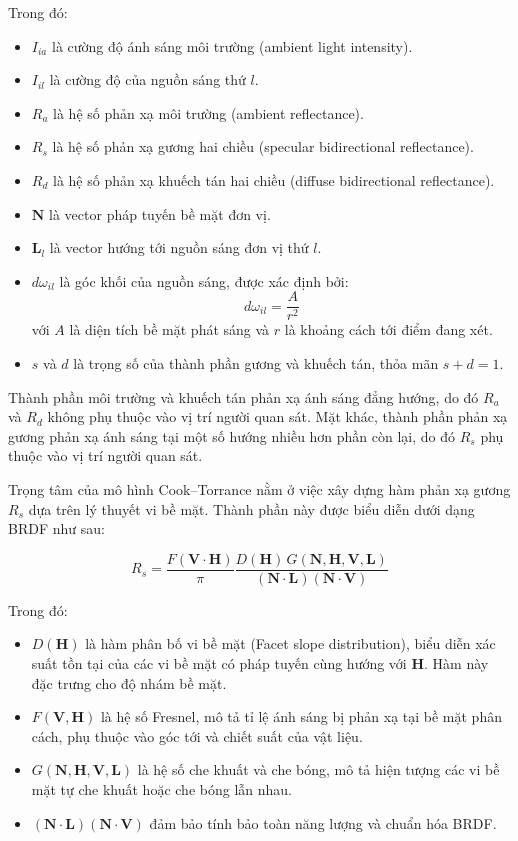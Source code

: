 Trong đó:
\begin{itemize}
	\item $I_{ia}$ là cường độ ánh sáng môi trường (ambient light intensity).
	\item $I_{il}$ là cường độ của nguồn sáng thứ $l$.
	\item $R_a$ là hệ số phản xạ môi trường (ambient reflectance).
	\item $R_s$ là hệ số phản xạ gương hai chiều (specular bidirectional reflectance).
	\item $R_d$ là hệ số phản xạ khuếch tán hai chiều (diffuse bidirectional reflectance).
	\item $\mathbf{N}$ là vector pháp tuyến bề mặt đơn vị.
	\item $\mathbf{L}_l$ là vector hướng tới nguồn sáng đơn vị thứ $l$.
	\item $d\omega_{il}$ là góc khối của nguồn sáng, được xác định bởi:
	\begin{equation}
		d\omega_{il} = \frac{A}{r^2}
	\end{equation}
	với $A$ là diện tích bề mặt phát sáng và $r$ là khoảng cách tới điểm đang xét.
	\item $s$ và $d$ là trọng số của thành phần gương và khuếch tán, thỏa mãn $s + d = 1$.
\end{itemize}

Thành phần môi trường và khuếch tán phản xạ ánh sáng đẳng hướng, do đó $R_a$ và $R_d$ không phụ thuộc vào vị trí người quan sát. Mặt khác, thành phần phản xạ gương phản xạ ánh sáng tại một số hướng nhiều hơn phần còn lại, do đó $R_s$ phụ thuộc vào vị trí người quan sát.

Trọng tâm của mô hình Cook--Torrance nằm ở việc xây dựng hàm phản xạ gương $R_s$ dựa trên lý thuyết vi bề mặt. Thành phần này được biểu diễn dưới dạng BRDF như sau:

\begin{equation}\label{eq:specular}
	R_s = \frac{F(\mathbf{V} \cdot \mathbf{H})}{\pi} \frac{D(\mathbf{H})\,G(\mathbf{N}, \mathbf{H}, \mathbf{V}, \mathbf{L})}{(\mathbf{N} \cdot \mathbf{L})(\mathbf{N} \cdot \mathbf{V})}
\end{equation}

Trong đó:

\begin{itemize}
	\item $D(\mathbf{H})$ là hàm phân bố vi bề mặt (Facet slope distribution), biểu diễn xác suất tồn tại của các vi bề mặt có pháp tuyến cùng hướng với $\mathbf{H}$. Hàm này đặc trưng cho độ nhám bề mặt.
	\item $F(\mathbf{V}, \mathbf{H})$ là hệ số Fresnel, mô tả tỉ lệ ánh sáng bị phản xạ tại bề mặt phân cách, phụ thuộc vào góc tới và chiết suất của vật liệu.
	\item $G(\mathbf{N}, \mathbf{H}, \mathbf{V}, \mathbf{L})$ là hệ số che khuất và che bóng, mô tả hiện tượng các vi bề mặt tự che khuất hoặc che bóng lẫn nhau.
	\item $(\mathbf{N} \cdot \mathbf{L})(\mathbf{N} \cdot \mathbf{V})$ đảm bảo tính bảo toàn năng lượng và chuẩn hóa BRDF.
\end{itemize}

